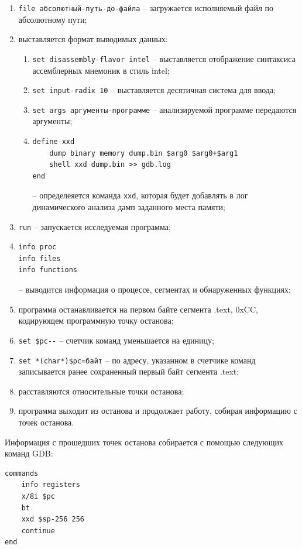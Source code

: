 \begin{enumerate}[label={\arabic*)}]
    \item \verb|file абсолютный-путь-до-файла| -- загружается исполняемый файл по абсолютному пути;
    \item выставляется формат выводимых данных:
            \begin{enumerate}[label={\arabic*)}]
                \item \verb|set disassembly-flavor intel| -- выставляется отображение синтаксиса
                    ассемблерных мнемоник в стиль intel;
                \item \verb|set input-radix 10| -- выставляется десятичная система для ввода;
                \item \verb|set args аргументы-программе| -- анализируемой программе передаются аргументы;
                \item 
                    \begin{Verbatim}
define xxd
    dump binary memory dump.bin $arg0 $arg0+$arg1
    shell xxd dump.bin >> gdb.log
end 
                    \end{Verbatim} 
                    -- определеяется команда \verb|xxd|, которая будет добавлять в лог
                            динамического анализа дамп заданного места памяти;
            \end{enumerate}
    \item \verb|run| -- запускается исследуемая программа;
    \item
        \begin{Verbatim}
info proc 
info files
info functions
        \end{Verbatim} 
        -- выводится информация о процессе, сегментах и обнаруженных функциях;
    \item программа останавливается на первом байте сегмента .text, 0xCC, кодирующем программную точку останова;
    \item \verb|set $pc--| -- счетчик команд уменьшается на единицу;
    \item \verb|set *(char*)$pc=байт| -- по адресу, указанном в счетчике команд записывается ранее сохраненный первый байт сегмента .text;
    \item расставляются относительные точки останова;
    \item программа выходит из останова и продолжает работу, собирая информацию с точек останова.
\end{enumerate}

Информация с прошедших точек останова собирается с помощью следующих команд GDB:
\begin{Verbatim}
commands
    info registers
    x/8i $pc
    bt
    xxd $sp-256 256
    continue
end
\end{Verbatim}

